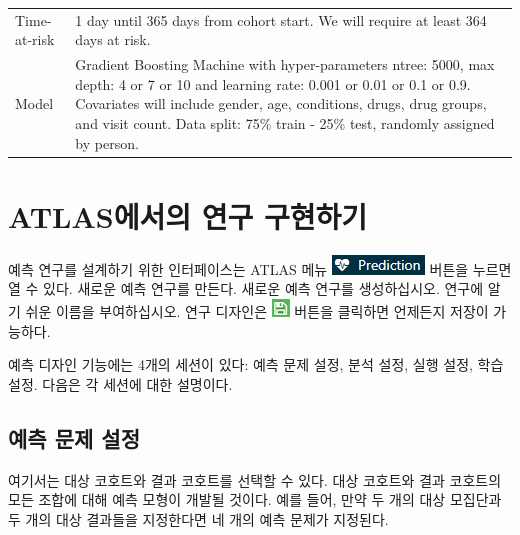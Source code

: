\documentclass[11pt]{book}
\theoremstyle{definition}
\theoremstyle{definition}
\theoremstyle{definition}
\theoremstyle{remark}
\begin{document}
\begin{longtable}[]{@{}ll@{}}
\begin{minipage}[t]{0.23\columnwidth}
Time-at-risk\strut
\end{minipage} & \begin{minipage}[t]{0.71\columnwidth}\raggedright\strut
1 day until 365 days from cohort start. We will require at least 364
days at risk.\strut
\end{minipage}\tabularnewline
\begin{minipage}[t]{0.23\columnwidth}\raggedright\strut
Model\strut
\end{minipage} & \begin{minipage}[t]{0.71\columnwidth}\raggedright\strut
Gradient Boosting Machine with hyper-parameters ntree: 5000, max depth:
4 or 7 or 10 and learning rate: 0.001 or 0.01 or 0.1 or 0.9. Covariates
will include gender, age, conditions, drugs, drug groups, and visit
count. Data split: 75\% train - 25\% test, randomly assigned by
person.\strut
\end{minipage}\tabularnewline
\bottomrule
\end{longtable}

\section{ATLAS에서의 연구 구현하기}\label{atlas--}

예측 연구를 설계하기 위한 인터페이스는 ATLAS 메뉴
\includegraphics{images/PatientLevelPrediction/predictionButton.png}
버튼을 누르면 열 수 있다. 새로운 예측 연구를 만든다. 새로운 예측 연구를
생성하십시오. 연구에 알기 쉬운 이름을 부여하십시오. 연구 디자인은
\includegraphics{images/PopulationLevelEstimation/save.png} 버튼을
클릭하면 언제든지 저장이 가능하다. 

예측 디자인 기능에는 4개의 세션이 있다: 예측 문제 설정, 분석 설정, 실행
설정, 학습 설정. 다음은 각 세션에 대한 설명이다.

\subsection{예측 문제 설정}\label{--}

여기서는 대상 코호트와 결과 코호트를 선택할 수 있다. 대상 코호트와 결과
코호트의 모든 조합에 대해 예측 모형이 개발될 것이다. 예를 들어, 만약 두
개의 대상 모집단과 두 개의 대상 결과들을 지정한다면 네 개의 예측 문제가
지정된다.
\end{document}
